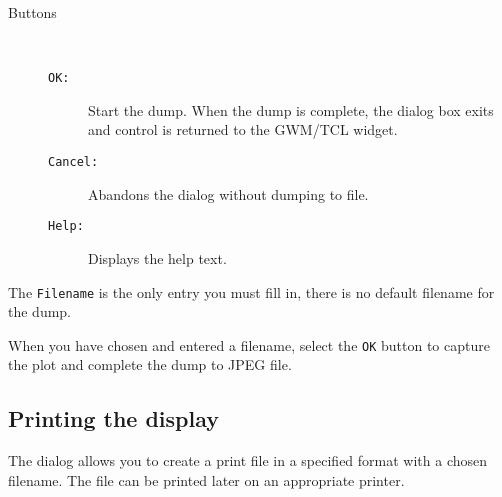 \begin{description}
\item[Buttons]~

\begin{description}

\item[{\tt{OK:}}] Start the dump.  When the dump is complete, the
{} dialog box exits and control is returned to the GWM/TCL
widget.

\item[{\tt{Cancel:}}] Abandons the {} dialog without
dumping to file.

\item[{\tt{Help:}}] Displays the help text.

\end{description}

\end{description}

The {\tt{Filename}} is the only entry you must fill in, there is no
default filename for the dump.

When you have chosen and entered a filename, select the {\tt{OK}} button to
capture the plot and complete the dump to JPEG file.

\subsection{\label{printing_the_display}Printing the display}

The {} dialog allows you to create a print file in a
specified format with a chosen filename.   The file can be printed
later on an appropriate printer.

